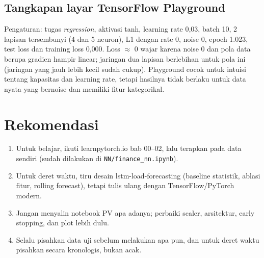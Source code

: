 \documentclass[11pt,a4paper]{article}
\begin{document}
\subsection{Tangkapan layar TensorFlow Playground}
Pengaturan: tugas \emph{regression}, aktivasi tanh, learning rate 0,03, batch 10, 2 lapisan tersembunyi (4 dan 5 neuron), L1 dengan rate 0, noise 0, epoch 1.023, test loss dan training loss 0,000. Loss $\approx$ 0 wajar karena noise 0 dan pola data berupa gradien hampir linear; jaringan dua lapisan berlebihan untuk pola ini (jaringan yang jauh lebih kecil sudah cukup). Playground cocok untuk intuisi tentang kapasitas dan learning rate, tetapi hasilnya tidak berlaku untuk data nyata yang bernoise dan memiliki fitur kategorikal.

\section{Rekomendasi}
\begin{enumerate}
  \item Untuk belajar, ikuti learnpytorch.io bab 00--02, lalu terapkan pada data sendiri (sudah dilakukan di \texttt{NN/finance\_nn.ipynb}).
  \item Untuk deret waktu, tiru desain lstm-load-forecasting (baseline statistik, ablasi fitur, rolling forecast), tetapi tulis ulang dengan TensorFlow/PyTorch modern.
  \item Jangan menyalin notebook PV apa adanya; perbaiki scaler, arsitektur, early stopping, dan plot lebih dulu.
  \item Selalu pisahkan data uji sebelum melakukan apa pun, dan untuk deret waktu pisahkan secara kronologis, bukan acak.
\end{enumerate}
\end{document}
